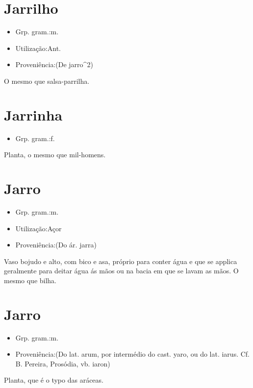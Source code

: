 \documentclass{article}
\begin{document}
\section{Jarrilho}
\begin{itemize}
\item {Grp. gram.:m.}
\end{itemize}
\begin{itemize}
\item {Utilização:Ant.}
\end{itemize}
\begin{itemize}
\item {Proveniência:(De \textunderscore jarro\textunderscore ^2)}
\end{itemize}
O mesmo que \textunderscore salsa-parrilha\textunderscore .
\section{Jarrinha}
\begin{itemize}
\item {Grp. gram.:f.}
\end{itemize}
Planta, o mesmo que \textunderscore mil-homens\textunderscore .
\section{Jarro}
\begin{itemize}
\item {Grp. gram.:m.}
\end{itemize}
\begin{itemize}
\item {Utilização:Açor}
\end{itemize}
\begin{itemize}
\item {Proveniência:(Do ár. \textunderscore jarra\textunderscore )}
\end{itemize}
Vaso bojudo e alto, com bico e asa, próprio para conter água e que se applica geralmente para deitar água ás mãos ou na bacia em que se lavam as mãos.
O mesmo que \textunderscore bilha\textunderscore .
\section{Jarro}
\begin{itemize}
\item {Grp. gram.:m.}
\end{itemize}
\begin{itemize}
\item {Proveniência:(Do lat. \textunderscore arum\textunderscore , por intermédio do cast. \textunderscore yaro\textunderscore , ou do lat. \textunderscore iarus\textunderscore . Cf. B. Pereira, \textunderscore Prosódia\textunderscore , vb. \textunderscore iaron\textunderscore )}
\end{itemize}
Planta, que é o typo das aráceas.
\end{document}
